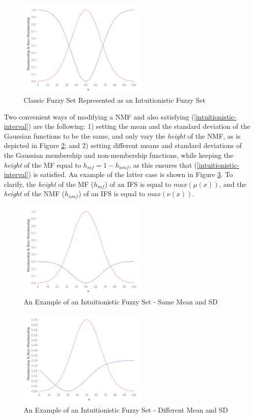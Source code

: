 \documentclass[conference]{IEEEtran}
\begin{document}
\begin{figure}[!t]
  \centering
  \includegraphics[width=2.5in]{fs-as-ifs}
  \caption{Classic Fuzzy Set Represented as an Intuitionistic Fuzzy Set}
  \label{fs-as-ifs}
\end{figure}

Two convenient ways of modifying a NMF and also
satisfying (\ref{intuitionistic-interval}) are the following: 1) setting
the mean and the standard deviation of the Gaussian functions to be
the same, and only vary the \textit{height} of the NMF,
as is depicted in Figure \ref{ifs}; and 2) setting different means and
standard deviations of the Gaussian membership and non-membership
functions, while keeping the \textit{height} of the MF equal
to $h_{mf} = 1 - h_{nmf}$, as this ensures that
(\ref{intuitionistic-interval}) is satisfied. An example of the latter
case is shown in Figure \ref{ifs-diff-mu-sd}. To clarify, the \textit{height}
of the MF ($h_{mf}$) of an IFS is equal to $max(\mu(x))$, and the
\textit{height} of the NMF ($h_{nmf}$) of an IFS is equal to $max(\nu(x))$.

\begin{figure}[!t]
  \centering
  \includegraphics[width=2.5in]{ifs}
  \caption{An Example of an Intuitionistic Fuzzy Set - Same Mean and SD}
  \label{ifs}
\end{figure}

\begin{figure}[!t]
  \centering
  \includegraphics[width=2.5in]{ifs-diff-mu-sd}
  \caption{An Example of an Intuitionistic Fuzzy Set - Different Mean
    and SD}
  \label{ifs-diff-mu-sd}
\end{figure}
\end{document}
